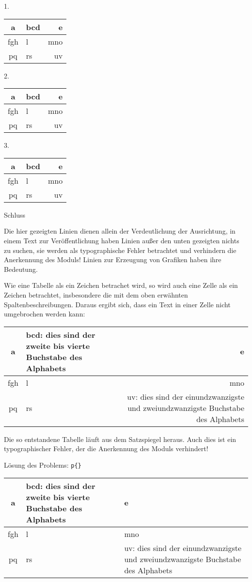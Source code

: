 \documentclass[ngerman,               %
               a4paper,               %
               fleqn,                 %
                     ]{scrartcl}       %
\begin{document}
1.%
\begin{tabular}{|c|l|r|}
  \hline
  a & bcd & e \\
  \hline
  fgh & l & mno \\
  \hline
  pq & rs & uv \\
  \hline
\end{tabular}%
2.%
\begin{tabular}[t]{|c|l|r|}
  a & bcd & e \\
  \hline
  fgh & l & mno \\
  \hline
  pq & rs & uv \\
  \hline
\end{tabular}%
3.%
\begin{tabular}[b]{|c|l|r|}
  \hline
  a & bcd & e \\
  \hline
  fgh & l & mno \\
  \hline
  pq & rs & uv \\
\end{tabular}%
Schluss

Die hier gezeigten Linien dienen allein der Verdeutlichung der Ausrichtung,
in einem Text zur Veröffentlichung haben Linien außer den unten gezeigten
nichts zu suchen, sie werden als typographische Fehler betrachtet und
verhindern die Anerkennung des Moduls! Linien zur Erzeugung von Grafiken
haben ihre Bedeutung.

Wie eine Tabelle als ein Zeichen betrachet wird, so wird auch eine Zelle
als ein Zeichen betrachtet, insbesondere die mit dem oben erwähnten
Spaltenbeschreibungen. Daraus ergibt sich, dass ein Text in einer Zelle
nicht umgebrochen werden kann:

\begin{tabular}{|c|l|r|}
  \hline
  a & bcd: dies sind der zweite bis vierte Buchstabe des Alphabets & e \\
  \hline
  fgh & l & mno \\
  \hline
  pq & rs & uv: dies sind der einundzwanzigste und zweiundzwanzigste
            Buchstabe des Alphabets \\
  \hline
\end{tabular}%

Die so entstandene Tabelle läuft aus dem Satzspiegel heraus. Auch dies ist
ein typographischer Fehler, der die Anerkennung des Moduls verhindert!

Lösung des Problems: \texttt{p\{\}}

\begin{tabular}{|c|p{4cm}|p{5cm}|}
  \hline
  a & bcd: dies sind der zweite bis vierte Buchstabe des Alphabets & e \\
  \hline
  fgh & l & mno \\
  \hline
  pq & rs & uv: dies sind der einundzwanzigste und zweiundzwanzigste
            Buchstabe des Alphabets \\
  \hline
\end{tabular}%
\end{document}

